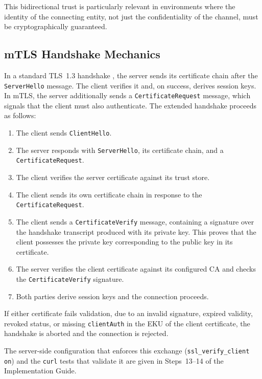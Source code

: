 \documentclass[10pt,twocolumn]{article}
\newcommand{\IGbase}{https://github.com/willLeckyThom/NetworkSecurity/blob/main/Projet/certificate_chain.md}
\newif\ifIGhref
\newcommand{\IGstep}[2]{\ifIGhref\href{\IGbase\##1}{#2}\else#2\fi}%
\begin{document}
This bidirectional trust is particularly relevant in environments where the
identity of the connecting entity, not just the confidentiality of the
channel, must be cryptographically guaranteed.

\subsection{mTLS Handshake Mechanics}

In a standard TLS~1.3 handshake \cite{rfc8446}, the server sends its
certificate chain after the \texttt{ServerHello} message. The client
verifies it and, on success, derives session keys. In mTLS, the server
additionally sends a \texttt{CertificateRequest} message, which signals
that the client must also authenticate. The extended handshake proceeds
as follows:

\begin{enumerate}
  \item The client sends \texttt{ClientHello}.
  \item The server responds with \texttt{ServerHello}, its certificate chain,
        and a \texttt{CertificateRequest}.
  \item The client verifies the server certificate against its trust store.
  \item The client sends its own certificate chain in response to the
        \texttt{CertificateRequest}.
  \item The client sends a \texttt{CertificateVerify} message, containing a
        signature over the handshake transcript produced with its private key.
        This proves that the client possesses the private key corresponding
        to the public key in its certificate.
  \item The server verifies the client certificate against its configured CA
        and checks the \texttt{CertificateVerify} signature.
  \item Both parties derive session keys and the connection proceeds.
\end{enumerate}

If either certificate fails validation, due to an invalid signature,
expired validity, revoked status, or missing \texttt{clientAuth} in the EKU
of the client certificate, the handshake is aborted and the connection is
rejected.

The server-side configuration that enforces this exchange
(\texttt{ssl\_verify\_client on}) and the \texttt{curl} tests that validate it
are given in \IGstep{step-13-configure-nginx-for-mtls}{Steps~13--14 of the
Implementation Guide}.
\end{document}
